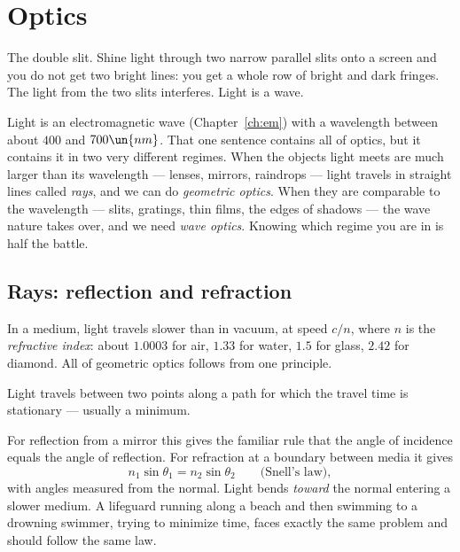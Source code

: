 \chapter{Optics}
\label{ch:optics}



\begin{prototype}
The double slit. Shine light through two narrow parallel slits onto a screen and you do not get two bright lines: you get a whole row of bright and dark fringes. The light from the two slits interferes. Light is a wave.
\end{prototype}

Light is an electromagnetic wave (Chapter~\ref{ch:em}) with a wavelength between about $400$ and $700\un{nm}$. That one sentence contains all of optics, but it contains it in two very different regimes. When the objects light meets are much larger than its wavelength --- lenses, mirrors, raindrops --- light travels in straight lines called \emph{rays}, and we can do \emph{geometric optics}. When they are comparable to the wavelength --- slits, gratings, thin films, the edges of shadows --- the wave nature takes over, and we need \emph{wave optics}. Knowing which regime you are in is half the battle.

\section{Rays: reflection and refraction}

In a medium, light travels slower than in vacuum, at speed $c/n$, where $n$ is the \emph{refractive index}: about $1.0003$ for air, $1.33$ for water, $1.5$ for glass, $2.42$ for diamond. All of geometric optics follows from one principle.

\begin{law}
Light travels between two points along a path for which the travel time is stationary --- usually a minimum.
\end{law}

For reflection from a mirror this gives the familiar rule that the angle of incidence equals the angle of reflection. For refraction at a boundary between media it gives
\[
  n_1\sin\theta_1 = n_2\sin\theta_2 \qquad\text{(Snell's law)},
\]
with angles measured from the normal. Light bends \emph{toward} the normal entering a slower medium. A lifeguard running along a beach and then swimming to a drowning swimmer, trying to minimize time, faces exactly the same problem and should follow the same law.

